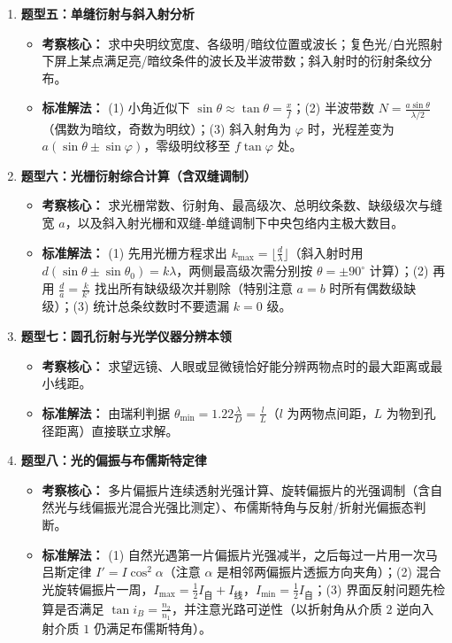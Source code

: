 \documentclass[zihao=5,a4paper,UTF8]{ctexart}
\begin{document}
\begin{typebox}[光的衍射与偏振常见题型分析]
\begin{enumerate}
    \item \textbf{题型五：单缝衍射与斜入射分析}
    \begin{itemize}
        \item \textbf{考察核心：} 求中央明纹宽度、各级明/暗纹位置或波长；复色光/白光照射下屏上某点满足亮/暗纹条件的波长及半波带数；斜入射时的衍射条纹分布。
        \item \textbf{标准解法：} (1) 小角近似下 $\sin\theta \approx \tan\theta = \frac{x}{f}$；(2) 半波带数 $N = \frac{a\sin\theta}{\lambda/2}$（偶数为暗纹，奇数为明纹）；(3) 斜入射角为 $\varphi$ 时，光程差变为 $a(\sin\theta \pm \sin\varphi)$，零级明纹移至 $f\tan\varphi$ 处。
    \end{itemize}
    \item \textbf{题型六：光栅衍射综合计算（含双缝调制）}
    \begin{itemize}
        \item \textbf{考察核心：} 求光栅常数、衍射角、最高级次、总明纹条数、缺级级次与缝宽 $a$，以及斜入射光栅和双缝-单缝调制下中央包络内主极大数目。
        \item \textbf{标准解法：} (1) 先用光栅方程求出 $k_{\max} = \lfloor \frac{d}{\lambda} \rfloor$（斜入射时用 $d(\sin\theta \pm \sin\theta_0) = k\lambda$，两侧最高级次需分别按 $\theta = \pm 90^\circ$ 计算）；(2) 再用 $\frac{d}{a} = \frac{k}{k'}$ 找出所有缺级级次并剔除（特别注意 $a=b$ 时所有偶数级缺级）；(3) 统计总条纹数时不要遗漏 $k=0$ 级。
    \end{itemize}
    \item \textbf{题型七：圆孔衍射与光学仪器分辨本领}
    \begin{itemize}
        \item \textbf{考察核心：} 求望远镜、人眼或显微镜恰好能分辨两物点时的最大距离或最小线距。
        \item \textbf{标准解法：} 由瑞利判据 $\theta_{\min} = 1.22\frac{\lambda}{D} = \frac{l}{L}$（$l$ 为两物点间距，$L$ 为物到孔径距离）直接联立求解。
    \end{itemize}
    \item \textbf{题型八：光的偏振与布儒斯特定律}
    \begin{itemize}
        \item \textbf{考察核心：} 多片偏振片连续透射光强计算、旋转偏振片的光强调制（含自然光与线偏振光混合光强比测定）、布儒斯特角与反射/折射光偏振态判断。
        \item \textbf{标准解法：} (1) 自然光遇第一片偏振片光强减半，之后每过一片用一次马吕斯定律 $I' = I\cos^2\alpha$（注意 $\alpha$ 是相邻两偏振片透振方向夹角）；(2) 混合光旋转偏振片一周，$I_{\max} = \frac{1}{2}I_{\text{自}} + I_{\text{线}}$，$I_{\min} = \frac{1}{2}I_{\text{自}}$；(3) 界面反射问题先检算是否满足 $\tan i_B = \frac{n_2}{n_1}$，并注意光路可逆性（以折射角从介质 $2$ 逆向入射介质 $1$ 仍满足布儒斯特角）。
    \end{itemize}
\end{enumerate}
\end{typebox}
\end{document}
